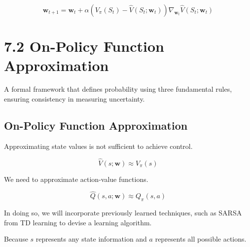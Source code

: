 \documentclass[
  letterpaper,
  DIV=11,
  numbers=noendperiod]{scrreprt}
\begin{document}
\[
\mathbf{w}_{t+1} = \mathbf{w}_{t} + \alpha(V_{\pi}(S_{t}) - \hat{V}(S_{t}; \mathbf{w}_{t}))\nabla_{\mathbf{w}_{t}} \hat{V}(S_{t}; \mathbf{w}_{t})
\]

\begin{tcolorbox}[enhanced jigsaw, opacityback=0, left=2mm, breakable, bottomtitle=1mm, rightrule=.15mm, colframe=quarto-callout-tip-color-frame, titlerule=0mm, colback=white, opacitybacktitle=0.6, toptitle=1mm, title=\textcolor{quarto-callout-tip-color}{\faLightbulb}\hspace{0.5em}{Solution}, colbacktitle=quarto-callout-tip-color!10!white, bottomrule=.15mm, arc=.35mm, coltitle=black, leftrule=.75mm, toprule=.15mm]

\end{tcolorbox}

\chapter{7.2 On-Policy Function
Approximation}\label{on-policy-function-approximation}

\begin{tcolorbox}[enhanced jigsaw, colback=white, left=2mm, breakable, opacityback=0, bottomrule=.15mm, rightrule=.15mm, arc=.35mm, colframe=quarto-callout-note-color-frame, leftrule=.75mm, toprule=.15mm]

A formal framework that defines probability using three fundamental
rules, ensuring consistency in measuring uncertainty. 🎲

\end{tcolorbox}

\section{On-Policy Function
Approximation}\label{on-policy-function-approximation-1}

Approximating state values is not sufficient to achieve control.

\[
\hat{V}(s; \mathbf{w}) \approx V_{\pi}(s)
\]

We need to approximate action-value functions.

\[
\hat{Q}(s,a; \mathbf{w}) \approx Q_{\pi}(s,a)
\]

In doing so, we will incorporate previously learned techniques, such as
SARSA from TD learning to devise a learning algorithm.

Because \(s\) represents any state information and \(a\) represents all
possible actions.
\end{document}
